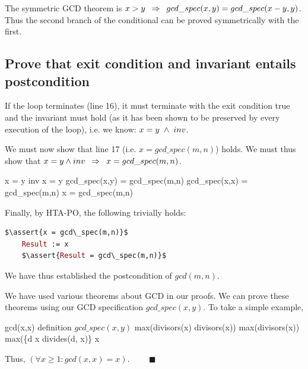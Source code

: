 \documentclass[runningheads,12pt]{article}
\def\assert#1{\textcolor{red}{ {\{} {#1} {\}}}}
\begin{document}
The symmetric GCD theorem is $x > y \; \; \mathbin\Rightarrow \; \; gcd\_spec(x,y) = gcd\_spec(x-y,y)$. Thus the second branch of the conditional can be proved symmetrically with the first. 


\subsection{Prove that exit condition and invariant entails postcondition} 

If the loop terminates (line 16), it must terminate with the exit condition true and the invariant must hold (as it has been shown to be preserved by every execution of the loop), i.e. we know: $x = y \; \land \; inv$.

We must now show that line 17 (i.e. $x = gcd\_spec(m,n)$) holds. We must thus show that $x = y \land inv \; \; \mathbin\Rightarrow \; \; x = gcd\_spec(m,n)$.
	
\begin{calculation}
	x = y \1\land inv
	x = y \1\land gcd\_spec(x,y) = gcd\_spec(m,n)
	gcd\_spec(x,x) = gcd\_spec(m,n)
	x = gcd\_spec(m,n) \qquad\blacksquare
\end{calculation}

Finally, by HTA-PO, the following trivially holds:
\begin{lstlisting}[language=eiffel]
    $\assert{x = gcd\_spec(m,n)}$
    Result := x
    $\assert{Result = gcd\_spec(m,n)}$
\end{lstlisting} 

\noindent We have thus established the postcondition of $gcd(m,n)$.  

We have used various theorems about GCD in our proofs. We can prove these theorems using our GCD specification $gcd\_spec(x,y)$. To take a simple example, 

\begin{calculation}
	gcd(x,x)
\hint{=} {definition $gcd\_spec(x,y)$}
	max(divisors(x) \binter divisors(x))
	max(divisors(x))
	max(\{d  \upto x \mid divides(d, x)\}
	x
\end{calculation}

Thus, $(\forall x \geq 1: gcd(x,x) = x)$. $\qquad\blacksquare$

\end{document}
